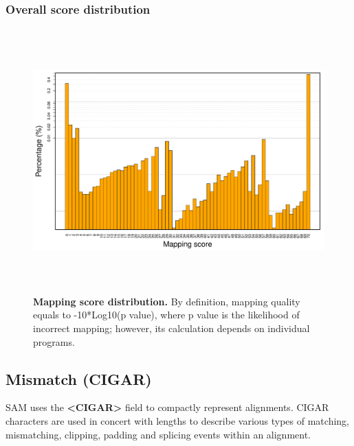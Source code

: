 \documentclass{article}
\begin{document}
\subsubsection{Overall score distribution}

\begin{center}
\begin{figure}[H]
\includegraphics[width=6.5in, height=4in]{bamchop-mapq-distribution}
\caption{\textbf{Mapping score distribution. } By definition, mapping quality equals to -10*Log10(p value), where p value is the likelihood of incorrect mapping; however, its calculation depends on individual programs.}
\end{figure}
\end{center}

\subsection{Mismatch (CIGAR)}
SAM uses the \textbf{<CIGAR>} field to compactly represent alignments. CIGAR characters are used in concert with lengths to describe various types of matching, mismatching, clipping, padding and splicing events within an alignment.
\end{document}
